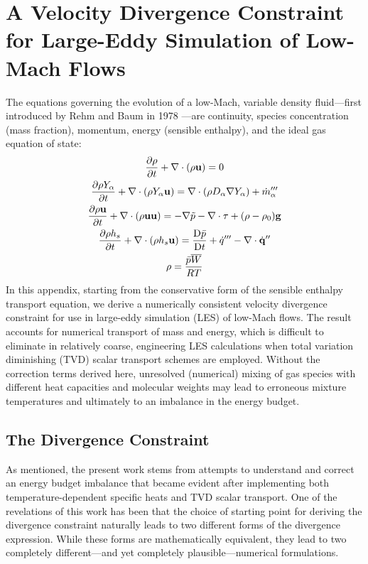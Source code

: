 




\chapter{A Velocity Divergence Constraint for Large-Eddy Simulation of Low-Mach Flows}
\label{app_divergence}

The equations governing the evolution of a low-Mach, variable density fluid---first introduced by Rehm and Baum in 1978
\cite{Rehm:1}---are continuity, species concentration (mass fraction), momentum, energy (sensible enthalpy), and the ideal gas
equation of state:
\begin{gather}
\label{eqn_rho} \frac{\partial \rho}{\partial t} + \nabla\cdot(\rho\mathbf{u}) = 0 \\
\label{eqn_Y_a} \frac{\partial \rho Y_\alpha}{\partial t} + \nabla\cdot(\rho Y_\alpha \mathbf{u}) = \nabla\cdot (\rho D_\alpha \nabla Y_\alpha)
+ \dot{m}_\alpha^{\prime\prime\prime} \\
\label{eqn_u}   \frac{\partial \rho \mathbf{u}}{\partial t} + \nabla\cdot(\rho \mathbf{u} \mathbf{u}) = -\nabla \tilde{p} -
\nabla\cdot\mathbf{\tau} + (\rho-\rho_0) \mathbf{g} \\
\label{eqn_h_s} \frac{\partial \rho h_s}{\partial t} + \nabla\cdot(\rho h_s \mathbf{u}) = \frac{\mbox{D} \bar{p}}{\mbox{D} t} +
\dot{q}^{\prime\prime\prime} - \nabla\cdot \dot{\mathbf{q}}^{\prime\prime} \\
\label{eqn_eos} \rho = \frac{\bar{p} \overline{W}}{RT}
\end{gather}
In this appendix, starting from the conservative form of the sensible enthalpy transport equation, we derive a numerically
consistent velocity divergence constraint for use in large-eddy simulation (LES) of low-Mach flows.  The result accounts for
numerical transport of mass and energy, which is difficult to eliminate in relatively coarse, engineering LES calculations when
total variation diminishing (TVD) scalar transport schemes are employed.  Without the correction terms derived here, unresolved
(numerical) mixing of gas species with different heat capacities and molecular weights may lead to erroneous mixture temperatures
and ultimately to an imbalance in the energy budget.

\section{The Divergence Constraint}
\label{div_constraint}

As mentioned, the present work stems from attempts to understand and correct an energy budget imbalance that became evident after
implementing both temperature-dependent specific heats and TVD scalar transport. One of the revelations of this work has been that
the choice of starting point for deriving the divergence constraint naturally leads to two different forms of the divergence
expression.  While these forms are mathematically equivalent, they lead to two completely different---and yet completely
plausible---numerical formulations.

